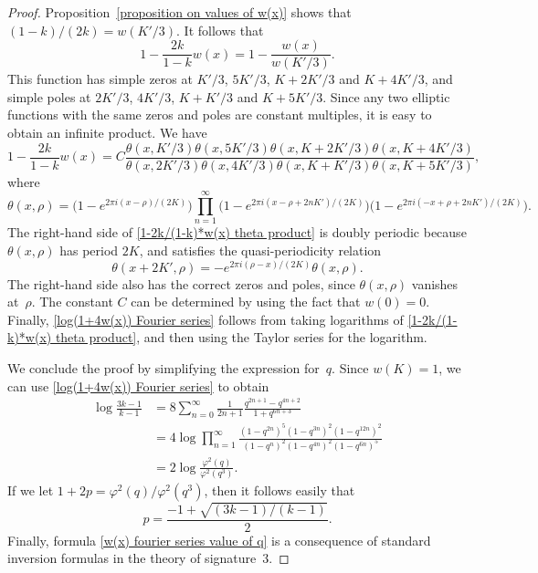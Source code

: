 \documentclass[12pt,reqno]{amsart}
\theoremstyle{remark}
\begin{document}
\begin{proof}
Proposition~\ref{proposition on values of w(x)} shows that
$(1-k)/(2k)=w(K'/3)$.  It follows that
\begin{equation*}
1-\frac{2k}{1-k}w(x)=1-\frac{w(x)}{w(K'/3)}.
\end{equation*}
This function has simple zeros at $K'/3$, $5K'/3$, $K+2K'/3$ and
$K+4K'/3$, and simple poles at $2K'/3$, $4K'/3$, $K+K'/3$ and
$K+5K'/3$. Since any two elliptic functions with the same zeros
and poles are constant multiples, it is easy to obtain an infinite
product. We have
\begin{equation}\label{1-2k/(1-k)*w(x) theta product}
1-\frac{2k}{1-k}w(x)
=C\frac{\theta(x,K'/3)\theta(x,5K'/3)\theta(x,K+2K'/3)\theta(x,K+4K'/3)}
{\theta(x,2K'/3)\theta(x,4K'/3)\theta(x,K+K'/3)\theta(x,K+5K'/3)},
\end{equation}
where
\begin{equation*}
\theta(x,\rho)=\bigl(1-e^{2\pi i(x-\rho)/(2K)}\bigr)
\prod_{n=1}^{\infty}\bigl(1-e^{2\pi i(x-\rho+2n K')/(2K)}\bigr)
\bigl(1-e^{2\pi i(-x+\rho+2n K')/(2K)}\bigr).
\end{equation*}
The right-hand side of \eqref{1-2k/(1-k)*w(x) theta product} is
doubly periodic because $\theta(x,\rho)$ has period $2K$,  and
satisfies the quasi-periodicity relation
$$
\theta(x+2K',\rho)=-e^{2\pi i(\rho-x)/(2K)}\theta(x,\rho).
$$
The right-hand side also has the correct zeros and poles, since
$\theta(x,\rho)$ vanishes at~$\rho$. The constant $C$ can be
determined by using the fact that $w(0)=0$. Finally,
\eqref{log(1+4w(x)) Fourier series} follows from taking logarithms
of \eqref{1-2k/(1-k)*w(x) theta product}, and then using the
Taylor series for the logarithm.

We conclude the proof by simplifying the expression for~$q$. Since
$w(K)=1$, we can use \eqref{log(1+4w(x)) Fourier series} to obtain
\begin{align*}
\log\frac{3k-1}{k-1}
&=8\sum_{n=0}^{\infty}\frac{1}{2n+1}\frac{q^{2n+1}-q^{4n+2}}{1+q^{6n+3}}
\\
&=4\log\prod_{n=1}^{\infty}\frac{(1-q^{2n})^5(1-q^{3n})^2(1-q^{12n})^2}{(1-q^{n})^2(1-q^{4n})^2(1-q^{6n})^5}
\\
&=2\log\frac{\varphi^2(q)}{\varphi^2(q^3)}.
\end{align*}
If we let $1+2p=\varphi^2(q)/\varphi^2(q^3)$, then it follows
easily that
$$
p=\frac{-1+\sqrt{(3k-1)/(k-1)}}{2}.
$$
Finally, formula \eqref{w(x) fourier series value of q} is a consequence of
standard inversion formulas in the theory of signature~$3$.
\end{proof}
\end{document}

